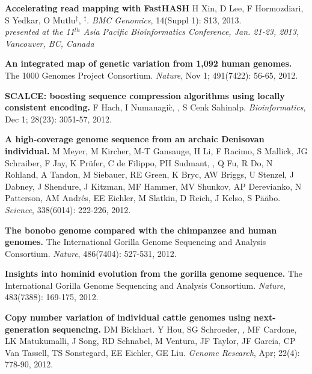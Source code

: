 \vspace{-.2cm}
        {\bf Accelerating read mapping with FastHASH}
        H Xin, D Lee, F Hormozdiari, S Yedkar, O Mutlu$^\ddag$, \calkan{}$^\ddag$.
        {\em BMC Genomics}, 14(Suppl 1): S13, 2013.\\
        \hspace*{1cm} {\footnotesize {\em presented at the  11$^{th}$  Asia Pacific Bioinformatics Conference,
            Jan. 21-23, 2013, Vancouver, BC, Canada}}
       
        
\vspace{-.2cm}
        {\bf An integrated map of genetic variation from 1,092 human genomes.}
        The 1000 Genomes Project Consortium. 
        {\em Nature}, Nov 1; 491(7422): 56-65, 2012.
        
\vspace{-.2cm}
        {\bf SCALCE: boosting sequence compression algorithms using locally consistent encoding.}
        F Hach, I Numanagi\`{c}, \calkan{}, S Cenk Sahinalp.  
        {\em Bioinformatics}, Dec 1; 28(23): 3051-57, 2012.


\vspace{-.2cm}
        {\bf A high-coverage genome sequence from an archaic Denisovan individual.}
        M Meyer, M Kircher, M-T Gansauge, H Li, F Racimo, S Mallick, JG Schraiber, F Jay, K Pr\"{u}fer, C de Filippo, PH Sudmant, 
        \calkan{}, Q Fu, R Do, N Rohland, A Tandon, M Siebauer, RE Green, 
        K Bryc, AW Briggs, U Stenzel, J Dabney, J Shendure, J Kitzman, MF Hammer, MV Shunkov, 
        AP Derevianko, N Patterson, AM Andr\'{e}s, EE Eichler, M Slatkin, D Reich, J Kelso, S P\"{a}\"{a}bo. 
        {\em Science}, 338(6014): 222-226, 2012.

\vspace{-.2cm}
        {\bf The bonobo genome compared with the chimpanzee and human genomes.}
        The International Gorilla Genome Sequencing and Analysis Consortium.
        {\em Nature}, 486(7404): 527-531, 2012.


\vspace{-.2cm}
    {\bf Insights into hominid evolution from the gorilla genome sequence.}
    The International Gorilla Genome Sequencing and Analysis Consortium.
    {\em Nature}, 483(7388): 169-175, 2012. 
    

\vspace{-.2cm}
    {\bf Copy number variation of individual cattle genomes using next-generation sequencing.} 
    DM Bickhart. Y Hou, SG Schroeder, \calkan{}, MF Cardone, LK Matukumalli, J Song, 
    RD Schnabel, M Ventura, JF Taylor, JF Garcia, CP Van Tassell, TS Sonstegard, EE Eichler, GE Liu. 
    {\em Genome Research}, Apr; 22(4): 778-90, 2012.
    
